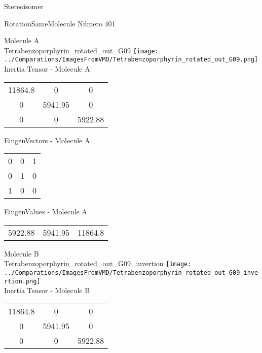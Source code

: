 \begin{center}
\vtab
\vtab
\textcolor{NavyBlue}{\Large Stereoisomer}
\end{center}

 \newpage

\vtab[-2cm]
\begin{center}
{\large RotationSameMolecule \tab Número 401}
\end{center}
\begin{multicols}{2}
\begin{center}

Molecule A \\ 
Tetrabenzoporphyrin\_rotated\_out\_G09
\texttt{[image: ../Comparations/ImagesFromVMD/Tetrabenzoporphyrin\_rotated\_out\_G09.png]}
\\
Inertia Tensor - Molecule A \\
\vtab

\begin{tabular}{|c c c|}
11864.8	 & 	0	 & 	0	 \\
0	 & 	5941.95	 & 	0	 \\
0	 & 	0	 & 	5922.88
\end{tabular}

\vtab
 EingenVectors - Molecule A     \\
\vtab
\begin{tabular}{|c c c|}
0	 & 	0	 & 	1	 \\
0	 & 	1	 & 	0	 \\
1	 & 	0	 & 	0
\end{tabular}

\vtab
 EingenValues - Molecule A     \\
\vtab
\begin{tabular}{|c c c|}
5922.88	 & 	5941.95	 & 	11864.8	 \\
\end{tabular}
\columnbreak

Molecule B \\ 
Tetrabenzoporphyrin\_rotated\_out\_G09\_invertion
\texttt{[image: ../Comparations/ImagesFromVMD/Tetrabenzoporphyrin\_rotated\_out\_G09\_invertion.png]}
\\
Inertia Tensor - Molecule B \\
\vtab

\begin{tabular}{|c c c|}
11864.8	 & 	0	 & 	0	 \\
0	 & 	5941.95	 & 	0	 \\
0	 & 	0	 & 	5922.88
\end{tabular}


\end{center}
\end{multicols}
